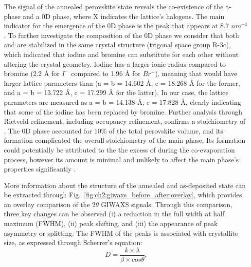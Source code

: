 The signal of the annealed perovskite state reveals the co-existence of the $\gamma$- phase and a 0D  phase, where X indicates the lattice's halogens. The main indicator for the emergence of the 0D phase is the peak that appears at 8.7 $nm^{-1}$. To further investigate the composition of the 0D phase we consider that both  and  are stabilized in the same crystal structure (trigonal space group R-3c), which indicated that iodine and bromine can substitute for each other without altering the crystal geometry. Iodine has a larger ionic radius compared to bromine (2.2 {\AA} for $I^-$ compared to 1.96 {\AA} for $Br^-$), meaning that  would have larger lattice parameters than  (a = b = 14.602 {\AA}, c = 18.268 {\AA} for the former, and a = b = 13.722 {\AA}, c = 17.299 {\AA} for the latter)\cite{Bhaumik2020BroadbandNanocrystals,DeBastiani2017InsideCrystals}. In our case, the lattice parameters are measured as a = b = 14.138 {\AA}, c = 17.828 {\AA}, clearly indicating that some of the iodine has been replaced by bromine.  Further analysis through Rietveld refinement, including occupancy refinement, confirms a stoichiometry of . The 0D phase accounted for 10\% of the total perovskite volume, and its formation complicated the overall stoichiometry of the main phase. Its formation could potentially be attributed to the the excess of  during the co-evaporation process, however its amount is minimal and unlikely to affect the main phase's properties significantly \cite{Bai2019AStability}. 

More information about the structure of the annealed and as-deposited state can be extracted through Fig.~\ref{fig:ch2:giwaxs_before_after:overlay}, which provides an overlay comparison of the $2\theta$ GIWAXS signals. Through this comparison, three key changes can be observed (i) a reduction in the full width at half maximum (FWHM), (ii) peak shifting, and (iii) the appearance of peak asymmetry or splitting. The FWHM of the peaks is associated with crystallite size, as expressed through Scherrer's equation: 
 \begin{equation}
     D = \frac{k \times \lambda}{\beta \times cos\theta},
 \end{equation}


